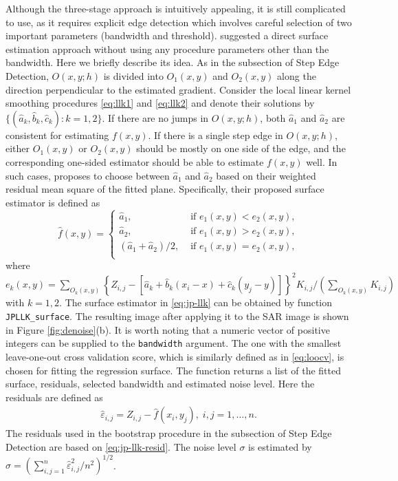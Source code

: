 Although the three-stage approach is intuitively appealing, it is still complicated to use, as it requires explicit edge detection which involves careful selection of two important parameters (bandwidth and threshold). \citet{qiu2009jump} suggested a direct surface estimation approach without using any procedure parameters other than the bandwidth. Here we briefly describe its idea. As in the subsection of Step Edge Detection, \(O(x, y; h)\) is divided into \(O_1(x, y)\) and \(O_2(x, y)\) along the direction perpendicular to the estimated gradient. Consider the local linear kernel smoothing procedures \eqref{eq:llk1} and \eqref{eq:llk2} and denote their solutions by \(\{(\widehat{a}_k, \widehat{b}_k, \widehat{c}_k): k = 1, 2 \}\). If there are no jumps in \(O(x, y; h)\), both \(\widehat{a}_1\) and \(\widehat{a}_2\) are consistent for estimating \(f(x, y)\). If there is a single step edge in \(O(x, y; h)\), either \(O_1(x, y)\) or \(O_2(x, y)\) should be mostly on one side of the edge, and the corresponding one-sided estimator should be able to estimate \(f(x, y)\) well. In such cases, \citet{qiu2009jump} proposes to choose between \(\widehat{a}_1\) and \(\widehat{a}_2\) based on their weighted residual mean square of the fitted plane. Specifically, their proposed surface estimator is defined as
\begin{equation}
  \label{eq:jp-llk}
  \widehat{f}(x, y) = \begin{cases}
    \widehat{a}_1, & \text{ if } e_1(x, y) < e_2(x, y), \\
    \widehat{a}_2, & \text{ if } e_1(x, y) > e_2(x, y), \\
    (\widehat{a}_1 + \widehat{a}_2)/2, & \text{ if } e_1(x, y) = e_2(x, y), \\
    \end{cases}
\end{equation}
where \(e_k(x, y) = \sum_{O_k(x, y)} \left\{ Z_{i, j} - \left[\widehat{a}_k + \widehat{b}_k(x_i - x) + \widehat{c}_k(y_j - y) \right] \right\}^2 K_{i, j}/(\sum_{O_k(x, y)} K_{i, j})\) with \(k = 1, 2\). The surface estimator in \eqref{eq:jp-llk} can be obtained by function \texttt{JPLLK\_surface}. The resulting image after applying it to the SAR image is shown in Figure \ref{fig:denoise}(b). It is worth noting that a numeric vector of positive integers can be supplied to the \texttt{bandwidth} argument. The one with the smallest leave-one-out cross validation score, which is similarly defined as in \eqref{eq:loocv}, is chosen for fitting the regression surface. The function returns a list of the fitted surface, residuals, selected bandwidth and estimated noise level. Here the residuals are defined as
\begin{align}
  \label{eq:jp-llk-resid}
  \widehat{\varepsilon}_{i, j} = Z_{i, j} - \widehat{f}(x_i, y_j), \; i, j = 1, \ldots, n. 
\end{align}
The residuals used in the bootstrap procedure in the subsection of Step Edge Detection are based on \eqref{eq:jp-llk-resid}. The noise level \(\sigma\) is estimated by \(\widehat{\sigma} = (\sum_{i, j = 1}^n \widehat{\varepsilon}_{i, j}^2/n^2)^{1/2}\).

